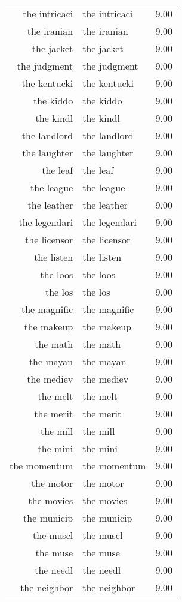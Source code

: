 \begin{table}[ht]
\begin{tabular}{rlr}
  the intricaci & the intricaci & 9.00 \\ 
  the iranian & the iranian & 9.00 \\ 
  the jacket & the jacket & 9.00 \\ 
  the judgment & the judgment & 9.00 \\ 
  the kentucki & the kentucki & 9.00 \\ 
  the kiddo & the kiddo & 9.00 \\ 
  the kindl & the kindl & 9.00 \\ 
  the landlord & the landlord & 9.00 \\ 
  the laughter & the laughter & 9.00 \\ 
  the leaf & the leaf & 9.00 \\ 
  the league & the league & 9.00 \\ 
  the leather & the leather & 9.00 \\ 
  the legendari & the legendari & 9.00 \\ 
  the licensor & the licensor & 9.00 \\ 
  the listen & the listen & 9.00 \\ 
  the loos & the loos & 9.00 \\ 
  the los & the los & 9.00 \\ 
  the magnific & the magnific & 9.00 \\ 
  the makeup & the makeup & 9.00 \\ 
  the math & the math & 9.00 \\ 
  the mayan & the mayan & 9.00 \\ 
  the mediev & the mediev & 9.00 \\ 
  the melt & the melt & 9.00 \\ 
  the merit & the merit & 9.00 \\ 
  the mill & the mill & 9.00 \\ 
  the mini & the mini & 9.00 \\ 
  the momentum & the momentum & 9.00 \\ 
  the motor & the motor & 9.00 \\ 
  the movies & the movies & 9.00 \\ 
  the municip & the municip & 9.00 \\ 
  the muscl & the muscl & 9.00 \\ 
  the muse & the muse & 9.00 \\ 
  the needl & the needl & 9.00 \\ 
  the neighbor & the neighbor & 9.00 \\ 

\end{tabular}
\end{table}
